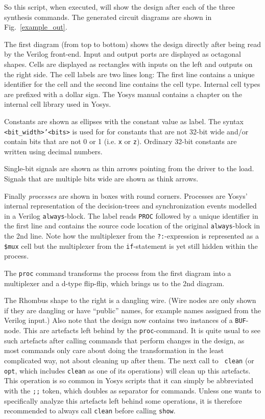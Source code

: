 \documentclass[9pt,technote,a4paper]{IEEEtran}
\begin{document}
So this script, when executed, will show the design after each of the three
synthesis commands. The generated circuit diagrams are shown in Fig.~\ref{example_out}.

The first diagram (from top to bottom) shows the design directly after being
read by the Verilog front-end. Input and output ports are displayed as
octagonal shapes. Cells are displayed as rectangles with inputs on the left
and outputs on the right side. The cell labels are two lines long: The first line
contains a unique identifier for the cell and the second line contains the cell
type. Internal cell types are prefixed with a dollar sign. The Yosys manual
contains a chapter on the internal cell library used in Yosys.

Constants are shown as ellipses with the constant value as label. The syntax
{\tt <bit\_width>'<bits>} is used for for constants that are not 32-bit wide
and/or contain bits that are not 0 or 1 (i.e. {\tt x} or {\tt z}). Ordinary
32-bit constants are written using decimal numbers.

Single-bit signals are shown as thin arrows pointing from the driver to the
load. Signals that are multiple bits wide are shown as think arrows.

Finally {\it processes\/} are shown in boxes with round corners. Processes
are Yosys' internal representation of the decision-trees and synchronization
events modelled in a Verilog {\tt always}-block. The label reads {\tt PROC}
followed by a unique identifier in the first line and contains the source code
location of the original {\tt always}-block in the 2nd line. Note how the
multiplexer from the {\tt ?:}-expression is represented as a {\tt \$mux} cell
but the multiplexer from the {\tt if}-statement is yet still hidden within the
process.

\medskip

The {\tt proc} command transforms the process from the first diagram into a
multiplexer and a d-type flip-flip, which brings us to the 2nd diagram.

The Rhombus shape to the right is a dangling wire. (Wire nodes are only shown
if they are dangling or have ``public'' names, for example names assigned from
the Verilog input.) Also note that the design now contains two instances of a
{\tt BUF}-node. This are artefacts left behind by the {\tt proc}-command. It is
quite usual to see such artefacts after calling commands that perform changes
in the design, as most commands only care about doing the transformation in the
least complicated way, not about cleaning up after them. The next call to {\tt
clean} (or {\tt opt}, which includes {\tt clean} as one of its operations) will
clean up this artefacts.  This operation is so common in Yosys scripts that it
can simply be abbreviated with the {\tt ;;} token, which doubles as
separator for commands. Unless one wants to specifically analyze this artefacts
left behind some operations, it is therefore recommended to always call {\tt clean}
before calling {\tt show}.
\end{document}
